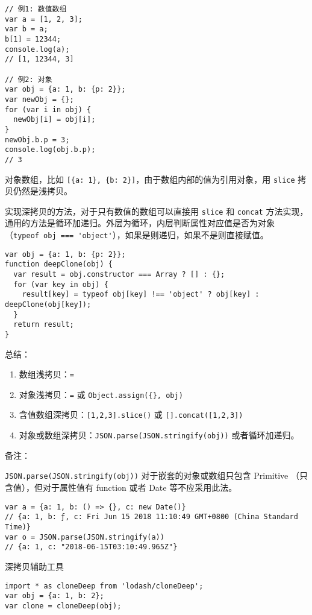 \begin{lstlisting}
// 例1: 数值数组
var a = [1, 2, 3];
var b = a;
b[1] = 12344;
console.log(a);
// [1, 12344, 3]

// 例2: 对象
var obj = {a: 1, b: {p: 2}};
var newObj = {};
for (var i in obj) {
  newObj[i] = obj[i];
}
newObj.b.p = 3;
console.log(obj.b.p);
// 3
\end{lstlisting}

对象数组，比如
\lstinline![{a: 1}, {b: 2}]!，由于数组内部的值为引用对象，用
\lstinline!slice! 拷贝仍然是浅拷贝。

实现深拷贝的方法，对于只有数值的数组可以直接用 \lstinline!slice! 和
\lstinline!concat!
方法实现，通用的方法是循环加递归。外层为循环，内层判断属性对应值是否为对象（\lstinline!typeof obj === 'object'!），如果是则递归，如果不是则直接赋值。

\begin{lstlisting}
var obj = {a: 1, b: {p: 2}};
function deepClone(obj) {
  var result = obj.constructor === Array ? [] : {};
  for (var key in obj) {
    result[key] = typeof obj[key] !== 'object' ? obj[key] : deepClone(obj[key]);
  }
  return result;
}
\end{lstlisting}

总结：

\begin{enumerate}
\def\labelenumi{\arabic{enumi}.}
\tightlist
\item
  数组浅拷贝：\lstinline!=!
\item
  对象浅拷贝：\lstinline!=! 或 \lstinline!Object.assign({}, obj)!
\item
  含值数组深拷贝：\lstinline![1,2,3].slice()! 或
  \lstinline![].concat([1,2,3])!
\item
  对象或数组深拷贝：\lstinline!JSON.parse(JSON.stringify(obj))!
  或者循环加递归。
\end{enumerate}

备注：

\lstinline!JSON.parse(JSON.stringify(obj))! 对于嵌套的对象或数组只包含
Primitive （只含值），但对于属性值有 function 或者 Date 等不应采用此法。

\begin{lstlisting}
var a = {a: 1, b: () => {}, c: new Date()}
// {a: 1, b: ƒ, c: Fri Jun 15 2018 11:10:49 GMT+0800 (China Standard Time)}
var o = JSON.parse(JSON.stringify(a))
// {a: 1, c: "2018-06-15T03:10:49.965Z"}
\end{lstlisting}

深拷贝辅助工具

\begin{lstlisting}
import * as cloneDeep from 'lodash/cloneDeep';
var obj = {a: 1, b: 2};
var clone = cloneDeep(obj);
\end{lstlisting}

